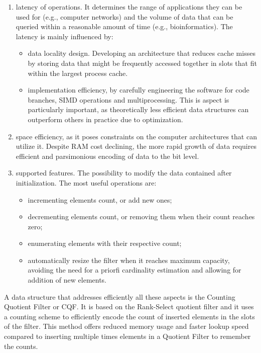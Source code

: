 \begin{enumerate}
	\item latency of \memb operations. It determines the range of applications they can be used for (e.g., computer networks) and the volume of data that can be queried within a reasonable amount of time (e.g., bioinformatics). The latency is mainly influenced by:
	\begin{itemize}
		\item data locality design. Developing an architecture that reduces cache misses by storing data that might be frequently accessed together in slots that fit within the largest process cache.
		\item implementation efficiency, by carefully engineering the software for code branches, SIMD operations and multiprocessing. This is aspect is particularly important, as theoretically less efficient data structures can outperform others in practice due to optimization.
	\end{itemize}
	\item space efficiency, as it poses constraints on the computer architectures that can utilize it. Despite RAM cost declining, the more rapid growth of data requires efficient and parsimonious encoding of data to the bit level.
	\item supported features. The possibility to modify the data contained after initialization. The most useful operations are:
	\begin{itemize}
		\item incrementing elements count, or add new ones; 
		\item decrementing elements count, or removing them when their count reaches zero;
		\item enumerating elements with their respective count;
		\item automatically resize the filter when it reaches maximum capacity, avoiding the need for a priorfi cardinality estimation and allowing for addition of new elements.
	\end{itemize}
\end{enumerate}
A data structure that addresses efficiently all these aspects is the Counting Quotient Filter or CQF. It is based on the Rank-Select quotient filter and it uses a counting scheme to efficiently encode the count of inserted elements in the slots of the filter. This method offers reduced memory usage and faster lookup speed compared to inserting multiple times elements in a Quotient Filter to remember the counts.
